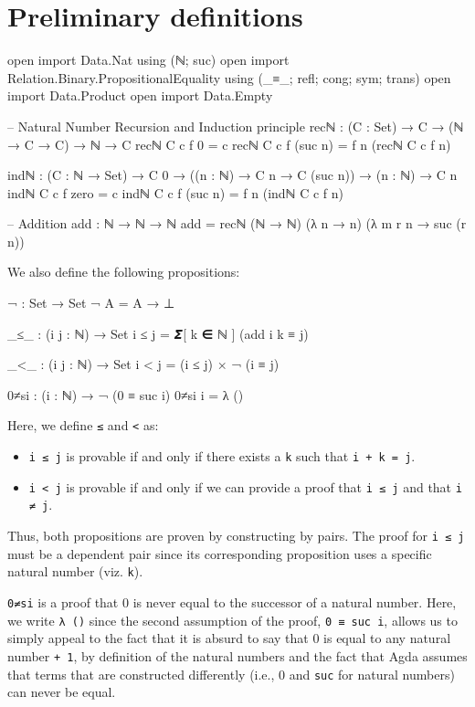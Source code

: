 \documentclass[12pt]{article}
\begin{document}
\maketitle

\section*{Preliminary definitions}

\begin{code}
  open import Data.Nat using (ℕ; suc)
  open import Relation.Binary.PropositionalEquality
    using (_≡_; refl; cong; sym; trans)
  open import Data.Product
  open import Data.Empty

  -- Natural Number Recursion and Induction principle
  recℕ : (C : Set) → C → (ℕ → C → C) → ℕ → C
  recℕ C c f 0 = c
  recℕ C c f (suc n) = f n (recℕ C c f n)

  indℕ : (C : ℕ → Set) → C 0 → ((n : ℕ) → C n → C (suc n)) →
         (n : ℕ) → C n
  indℕ C c f zero = c
  indℕ C c f (suc n) = f n (indℕ C c f n)

  -- Addition
  add : ℕ → ℕ → ℕ
  add = recℕ (ℕ → ℕ) (λ n → n) (λ m r n → suc (r n))
\end{code}
We also define the following propositions:
\begin{code}
  ¬ : Set → Set
  ¬ A = A → ⊥

  _≤_ : (i j : ℕ) → Set
  i ≤ j = 𝞢[ k ∈ ℕ ] (add i k ≡ j)

  _<_ : (i j : ℕ) → Set
  i < j = (i ≤ j) × ¬ (i ≡ j)

  0≠si : (i : ℕ) → ¬ (0 ≡ suc i)
  0≠si i = λ ()

\end{code}
Here, we define {\tt ≤} and {\tt <} as:
\begin{itemize}
\item {\tt i ≤ j} is provable if and only if there exists a {\tt k} such that
  {\tt i + k = j}.
\item {\tt i < j} is provable if and only if we can provide a proof that
  {\tt i ≤ j} and that {\tt i ≠ j}.
\end{itemize}
Thus, both propositions are proven by constructing by pairs. The proof for
{\tt i ≤ j} must be a dependent pair since its corresponding proposition
uses a specific natural number (viz. {\tt k}).

{\tt 0≠si} is a proof that 0 is never equal to the successor of a natural
number. Here, we write {\tt λ ()} since the second assumption of the proof,
{\tt 0 ≡ suc i}, allows us to simply appeal to the fact that it is absurd to say
that 0 is equal to any natural number {\tt + 1}, by definition of the natural
numbers and the fact that Agda assumes that terms that are constructed
differently (i.e., 0 and {\tt suc} for natural numbers) can never be equal.
\end{document}
